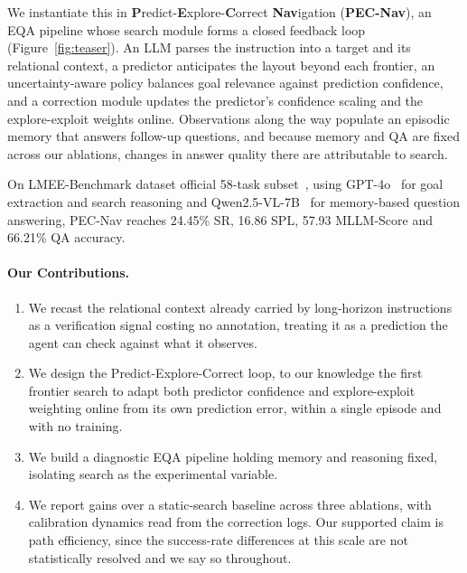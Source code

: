 We instantiate this in \textbf{P}redict-\textbf{E}xplore-\textbf{C}orrect \textbf{Nav}igation (\textbf{PEC-Nav}), an EQA pipeline whose search module forms a closed feedback loop (Figure~\ref{fig:teaser}). An LLM parses the instruction into a target and its relational context, a predictor anticipates the layout beyond each frontier, an uncertainty-aware policy balances goal relevance against prediction confidence, and a correction module updates the predictor's confidence scaling and the explore-exploit weights online. Observations along the way populate an episodic memory that answers follow-up questions, and because memory and QA are fixed across our ablations, changes in answer quality there are attributable to search.

On LMEE-Benchmark dataset official 58-task subset~\cite{wang2026memoryexplorer}, using GPT-4o~\cite{openai2024gpt4o} for goal extraction and search reasoning and Qwen2.5-VL-7B~\cite{bai2025qwen25vl} for memory-based question answering, PEC-Nav reaches 24.45\% SR, 16.86 SPL, 57.93 MLLM-Score and 66.21\% QA accuracy.

\paragraph{Our Contributions.}
\begin{enumerate}
    \item We recast the relational context already carried by long-horizon instructions as a verification signal costing no annotation, treating it as a prediction the agent can check against what it observes.
    \item We design the Predict-Explore-Correct loop, to our knowledge the first frontier search to adapt both predictor confidence and explore-exploit weighting online from its own prediction error, within a single episode and with no training.
    \item We build a diagnostic EQA pipeline holding memory and reasoning fixed, isolating search as the experimental variable.
    \item We report gains over a static-search baseline across three ablations, with calibration dynamics read from the correction logs. Our supported claim is path efficiency, since the success-rate differences at this scale are not statistically resolved and we say so throughout.
\end{enumerate}
